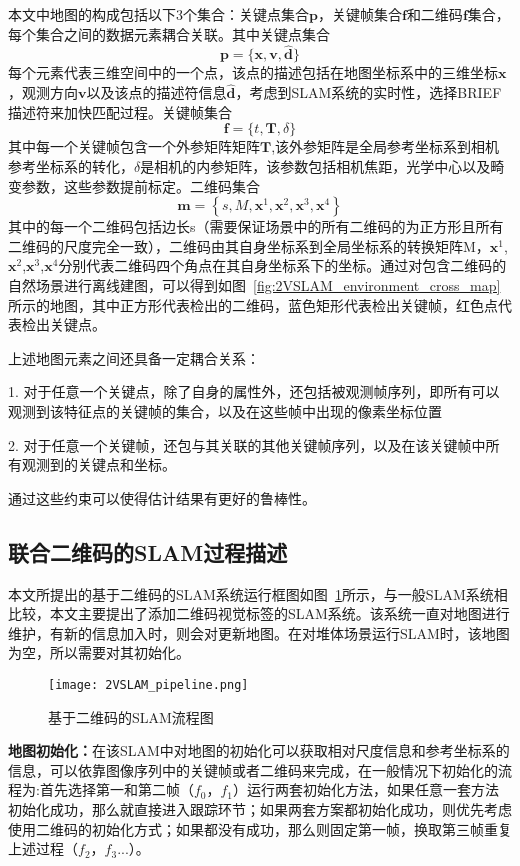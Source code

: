 本文中地图的构成包括以下3个集合：关键点集合$\mathbf{p}$，关键帧集合$\mathbf{f}$和二维码$\mathbf{f}$集合，每个集合之间的数据元素耦合关联。其中关键点集合
\begin{equation} \mathbf{p}=\{\mathbf{x}, \mathbf{v}, \hat{\mathbf{d}}\}\end{equation}
每个元素代表三维空间中的一个点，该点的描述包括在地图坐标系中的三维坐标$\mathbf{x}$，观测方向$\mathbf{v}$以及该点的描述符信息$\hat{\mathbf{d}}$，考虑到SLAM系统的实时性，选择BRIEF描述符来加快匹配过程。关键帧集合
\begin{equation}\mathbf{f}=\{t, \mathbf{T}, \delta\}\end{equation}
其中每一个关键帧包含一个外参矩阵矩阵$\mathbf{T}$,该外参矩阵是全局参考坐标系到相机参考坐标系的转化，$\delta$是相机的内参矩阵，该参数包括相机焦距，光学中心以及畸变参数，这些参数提前标定。二维码集合
\begin{equation}\mathbf{m}=\left\{s, M, \mathbf{x}^{1}, \mathbf{x}^{2}, \mathbf{x}^{3}, \mathbf{x}^{4}\right\}\end{equation}
其中的每一个二维码包括边长s（需要保证场景中的所有二维码的为正方形且所有二维码的尺度完全一致），二维码由其自身坐标系到全局坐标系的转换矩阵M，$\mathbf{x}^{1}$,$\mathbf{x}^{2}$,$\mathbf{x}^{3}$,$\mathbf{x}^{4}$分别代表二维码四个角点在其自身坐标系下的坐标。通过对包含二维码的自然场景进行离线建图，可以得到如图~\ref{fig:2VSLAM_environment_cross_map}所示的地图，其中正方形代表检出的二维码，蓝色矩形代表检出关键帧，红色点代表检出关键点。

上述地图元素之间还具备一定耦合关系：

1.	对于任意一个关键点，除了自身的属性外，还包括被观测帧序列，即所有可以观测到该特征点的关键帧的集合，以及在这些帧中出现的像素坐标位置

2.	对于任意一个关键帧，还包与其关联的其他关键帧序列，以及在该关键帧中所有观测到的关键点和坐标。

通过这些约束可以使得估计结果有更好的鲁棒性。
\subsection{联合二维码的SLAM过程描述}
\label{sec:2.3.3}
本文所提出的基于二维码的SLAM系统运行框图如图~\ref{fig:2VSLAM_pipeline}所示，与一般SLAM系统相比较，本文主要提出了添加二维码视觉标签的SLAM系统。该系统一直对地图进行维护，有新的信息加入时，则会对更新地图。在对堆体场景运行SLAM时，该地图为空，所以需要对其初始化。
\begin{figure}[H] %
\centering
\texttt{[image: 2VSLAM\_pipeline.png]}
  \caption{基于二维码的SLAM流程图}
  \label{fig:2VSLAM_pipeline}
\end{figure}
\textbf{地图初始化：}在该SLAM中对地图的初始化可以获取相对尺度信息和参考坐标系的信息，可以依靠图像序列中的关键帧或者二维码来完成，在一般情况下初始化的流程为:首先选择第一和第二帧（$f_0$，$f_1$）运行两套初始化方法，如果任意一套方法初始化成功，那么就直接进入跟踪环节；如果两套方案都初始化成功，则优先考虑使用二维码的初始化方式；如果都没有成功，那么则固定第一帧，换取第三帧重复上述过程（$f_2$，$f_3$...）。

